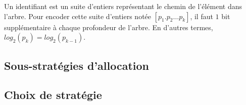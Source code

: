 Un identifiant \LSEQ est un suite d'entiers représentant le chemin de l'élément
dans l'arbre. Pour encoder cette suite d'entiers notée $[p_1.p_2\ldots p_k]$, il
faut $1$ bit supplémentaire à chaque profondeur de l'arbre. En d'autres termes,
$log_2(p_k) = log_2(p_{k-1})$.

\subsection{Sous-stratégies d'allocation}


\subsection{Choix de stratégie}

